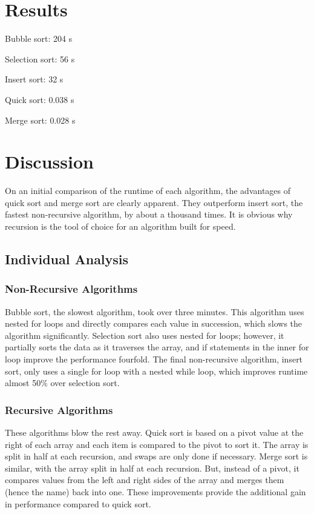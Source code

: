 \documentclass[conference]{IEEEtran}
\begin{document}
\section{Results}
Bubble sort: 204 s

Selection sort: 56 s

Insert sort: 32 s

Quick sort: 0.038 s

Merge sort: 0.028 s

\section{Discussion}
On an initial comparison of the runtime of each algorithm, the advantages of quick sort 
and merge sort are clearly apparent. They outperform insert sort, the fastest 
non-recursive algorithm, by about a thousand times. It is obvious why recursion is the 
tool of choice for an algorithm built for speed.

\subsection{Individual Analysis}

\subsubsection{Non-Recursive Algorithms}
Bubble sort, the slowest algorithm, took over three minutes. This algorithm uses nested 
for loops and directly compares each value in succession, which slows the algorithm 
significantly. Selection sort also uses nested for loops; however, it partially sorts 
the data as it traverses the array, and if statements in the inner for loop improve the 
performance fourfold. The final non-recursive algorithm, insert sort, only uses a 
single for loop with a nested while loop, which improves runtime almost 50\% over 
selection sort.

\subsubsection{Recursive Algorithms}
These algorithms blow the rest away. Quick sort is based on a pivot value at the right 
of each array and each item is compared to the pivot to sort it. The array is split in 
half at each recursion, and swaps are only done if necessary. Merge sort is similar, 
with the array split in half at each recursion. But, instead of a pivot, it compares 
values from the left and right sides of the array and merges them (hence the name) back 
into one. These improvements provide the additional gain in performance compared to 
quick sort.
\end{document}
